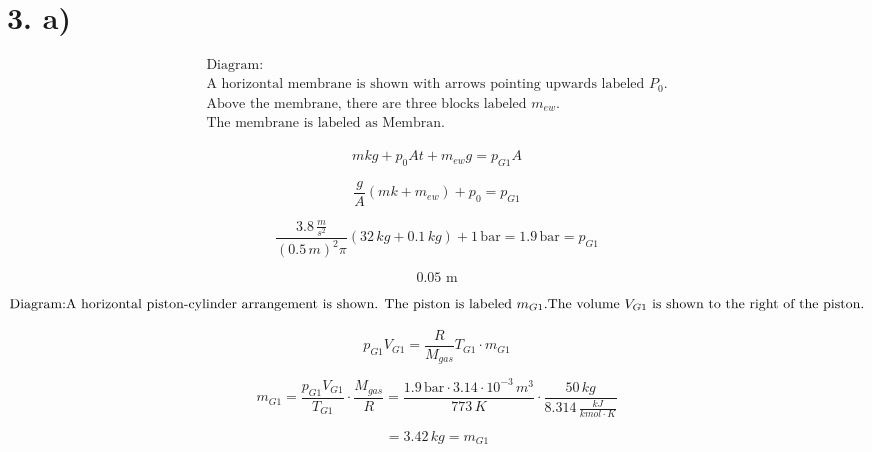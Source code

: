 \section*{3. a)}

\begin{equation*}
\begin{array}{l}
\text{Diagram:} \\
\text{A horizontal membrane is shown with arrows pointing upwards labeled } P_0. \\
\text{Above the membrane, there are three blocks labeled } m_{ew}. \\
\text{The membrane is labeled as } \text{Membran}. \\
\end{array}
\end{equation*}

\begin{equation*}
m k g + p_0 A t + m_{ew} g = p_{G1} A
\end{equation*}

\begin{equation*}
\frac{g}{A} (m k + m_{ew}) + p_0 = p_{G1}
\end{equation*}

\begin{equation*}
\frac{3.8 \, \frac{m}{s^2}}{(0.5 \, m)^2 \pi} (32 \, kg + 0.1 \, kg) + 1 \, \text{bar} = 1.9 \, \text{bar} = p_{G1}
\end{equation*}

\begin{equation*}
\text{0.05 m}
\end{equation*}

\begin{equation*}
\text{Diagram:} \\
\text{A horizontal piston-cylinder arrangement is shown. The piston is labeled } m_{G1}. \\
\text{The volume } V_{G1} \text{ is shown to the right of the piston.} \\
\end{equation*}

\begin{equation*}
p_{G1} V_{G1} = \frac{R}{M_{gas}} T_{G1} \cdot m_{G1}
\end{equation*}

\begin{equation*}
m_{G1} = \frac{p_{G1} V_{G1}}{T_{G1}} \cdot \frac{M_{gas}}{R} = \frac{1.9 \, \text{bar} \cdot 3.14 \cdot 10^{-3} \, m^3}{773 \, K} \cdot \frac{50 \, kg}{8.314 \, \frac{kJ}{kmol \cdot K}}
\end{equation*}

\begin{equation*}
= 3.42 \, kg = m_{G1}
\end{equation*}